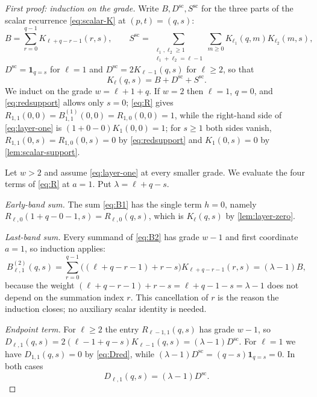 \documentclass[11pt,reqno]{amsart}
\theoremstyle{definition}
\theoremstyle{remark}
\newcommand{\one}{\mathbf 1}
\begin{document}
\begin{proof}[First proof: induction on the grade]
Write $B,D^{\mathrm{sc}},S^{\mathrm{sc}}$ for the three parts of the scalar
recurrence \eqref{eq:scalar-K} at $(p,t)=(q,s)$:
\begin{equation}\label{eq:scalar-parts}
 B=\sum_{r=0}^{q-1}K_{\ell+q-r-1}(r,s),\qquad
 S^{\mathrm{sc}}=\sum_{\substack{\ell_1,\ell_2\geq1\\ \ell_1+\ell_2=\ell-1}}
 \sum_{m\geq0}K_{\ell_1}(q,m)K_{\ell_2}(m,s),
\end{equation}
$D^{\mathrm{sc}}=\one_{q=s}$ for $\ell=1$ and $D^{\mathrm{sc}}=2K_{\ell-1}(q,s)$
for $\ell\geq2$, so that
\begin{equation}\label{eq:scalar-sum}
 K_\ell(q,s)=B+D^{\mathrm{sc}}+S^{\mathrm{sc}} .
\end{equation}
We induct on the grade $w=\ell+1+q$.  If $w=2$ then $\ell=1$, $q=0$, and
\eqref{eq:redsupport} allows only $s=0$; \eqref{eq:R} gives
$R_{1,1}(0,0)=B^{(1)}_{1,1}(0,0)=R_{1,0}(0,0)=1$, while the right-hand side
of \eqref{eq:layer-one} is $(1+0-0)K_1(0,0)=1$; for $s\geq1$ both sides
vanish, $R_{1,1}(0,s)=R_{1,0}(0,s)=0$ by \eqref{eq:redsupport} and
$K_1(0,s)=0$ by \cref{lem:scalar-support}.

Let $w>2$ and assume \eqref{eq:layer-one} at every smaller grade.  We
evaluate the four terms of \eqref{eq:R} at $a=1$.  Put
$\lambda=\ell+q-s$.

\emph{Early-band sum.}  The sum \eqref{eq:B1} has the single term $h=0$,
namely $R_{\ell,0}(1+q-0-1,s)=R_{\ell,0}(q,s)$, which is $K_\ell(q,s)$ by
\cref{lem:layer-zero}.

\emph{Last-band sum.}  Every summand of \eqref{eq:B2} has grade $w-1$ and
first coordinate $a=1$, so induction applies:
\[
 B^{(2)}_{\ell,1}(q,s)=\sum_{r=0}^{q-1}\bigl((\ell+q-r-1)+r-s\bigr)
 K_{\ell+q-r-1}(r,s)
 =(\lambda-1)B,
\]
because the weight $(\ell+q-r-1)+r-s=\ell+q-1-s=\lambda-1$ does not depend
on the summation index $r$.  This cancellation of $r$ is the reason the
induction closes; no auxiliary scalar identity is needed.

\emph{Endpoint term.}  For $\ell\geq2$ the entry $R_{\ell-1,1}(q,s)$ has
grade $w-1$, so
$D_{\ell,1}(q,s)=2(\ell-1+q-s)K_{\ell-1}(q,s)=(\lambda-1)D^{\mathrm{sc}}$.
For $\ell=1$ we have $D_{1,1}(q,s)=0$ by \eqref{eq:Dred}, while
$(\lambda-1)D^{\mathrm{sc}}=(q-s)\one_{q=s}=0$.  In both cases
\begin{equation}\label{eq:Dmatch}
 D_{\ell,1}(q,s)=(\lambda-1)D^{\mathrm{sc}} .
\end{equation}


\end{proof}
\end{document}
